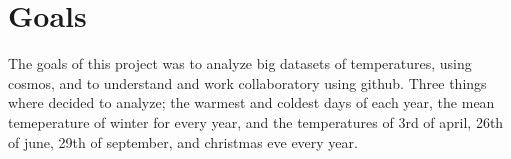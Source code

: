 \section{Goals}
The goals of this project was to analyze big datasets of temperatures, using cosmos, and to understand and work collaboratory using github. 
Three things where decided to analyze; the warmest and coldest days of each year, 
the mean temeperature of winter for every year, and the temperatures of 3rd of april, 26th of june, 29th of september, and christmas eve every year.
 